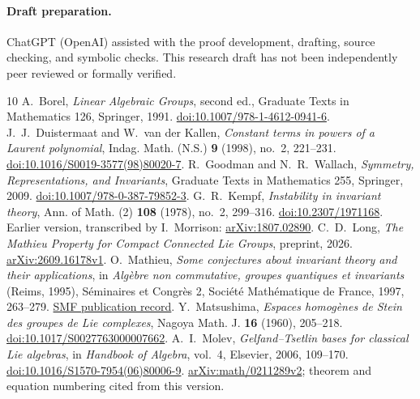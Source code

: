 \documentclass[11pt]{article}
\numberwithin{equation}{section}
\theoremstyle{definition}
\theoremstyle{remark}
\begin{document}
\paragraph{Draft preparation.}
ChatGPT (OpenAI) assisted with the proof development, drafting, source checking, and symbolic checks. This research draft has not been independently peer reviewed or formally verified.

\begin{thebibliography}{10}
A.~Borel, \emph{Linear Algebraic Groups}, second ed., Graduate Texts in Mathematics 126, Springer, 1991.
\href{https://doi.org/10.1007/978-1-4612-0941-6}{doi:10.1007/978-1-4612-0941-6}.
J.~J.~Duistermaat and W.~van der Kallen, \emph{Constant terms in powers of a Laurent polynomial}, Indag. Math. (N.S.) \textbf{9} (1998), no.~2, 221--231.
\href{https://doi.org/10.1016/S0019-3577(98)80020-7}{doi:10.1016/S0019-3577(98)80020-7}.
R.~Goodman and N.~R.~Wallach, \emph{Symmetry, Representations, and Invariants}, Graduate Texts in Mathematics 255, Springer, 2009.
\href{https://doi.org/10.1007/978-0-387-79852-3}{doi:10.1007/978-0-387-79852-3}.
G.~R.~Kempf, \emph{Instability in invariant theory}, Ann. of Math. (2) \textbf{108} (1978), no.~2, 299--316.
\href{https://doi.org/10.2307/1971168}{doi:10.2307/1971168}.
Earlier version, transcribed by I.~Morrison:
\href{https://arxiv.org/abs/1807.02890}{arXiv:1807.02890}.
C.~D.~Long, \emph{The Mathieu Property for Compact Connected Lie Groups}, preprint, 2026.
\href{https://arxiv.org/abs/2609.16178v1}{arXiv:2609.16178v1}.
O.~Mathieu, \emph{Some conjectures about invariant theory and their applications}, in \emph{Alg\`ebre non commutative, groupes quantiques et invariants} (Reims, 1995), S\'eminaires et Congr\`es 2, Soci\'et\'e Math\'ematique de France, 1997, 263--279.
\href{https://smf.emath.fr/publications/some-conjectures-about-invariant-theory-and-their-applications}{SMF publication record}.
Y.~Matsushima, \emph{Espaces homog\`enes de Stein des groupes de Lie complexes}, Nagoya Math. J. \textbf{16} (1960), 205--218.
\href{https://doi.org/10.1017/S0027763000007662}{doi:10.1017/S0027763000007662}.
A.~I.~Molev, \emph{Gelfand--Tsetlin bases for classical Lie algebras}, in \emph{Handbook of Algebra}, vol.~4, Elsevier, 2006, 109--170.
\href{https://doi.org/10.1016/S1570-7954(06)80006-9}{doi:10.1016/S1570-7954(06)80006-9}.
\href{https://arxiv.org/abs/math/0211289v2}{arXiv:math/0211289v2}; theorem and equation numbering cited from this version.
\end{thebibliography}
\end{document}
